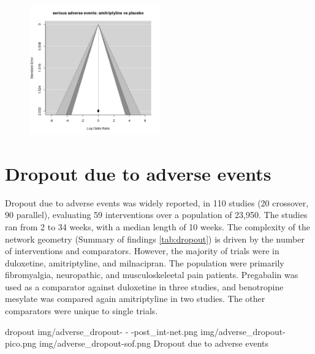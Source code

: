 \documentclass{report}\usepackage[]{graphicx}\usepackage[]{color}
\begin{document}
\begin{figure}
\centering
\includegraphics[width=0.5\textwidth]{
img/serious_adverse-amitriptyline-placebo-funnel.png}
\caption[SAE, amiptriptyline]{}
\label{fig:sae-ami-plac}
\end{figure}


\section{Dropout due to adverse events}

Dropout due to adverse events was widely reported, in 110 studies (20 crossover, 90 parallel), evaluating 59 interventions over a population of 23,950. The studies ran from 2 to 34 weeks, with a median length of 10 weeks. The complexity of the network geometry (Summary of findings \ref{tab:dropout}) is driven by the number of interventions and comparators. However, the majority of trials were in duloxetine, amitriptyline, and milnacipran. The population were primarily fibromyalgia, neuropathic, and musculoskeleetal pain patients. Pregabalin was used as a comparator against duloxetine in three studies, and benotropine mesylate was compared again amitriptyline in two studies. The other comparators were unique to single trials.

\soffignew
{dropout}
{img/adverse_dropout- - -post_int-net.png}
{img/adverse_dropout-pico.png}
{img/adverse_dropout-sof.png}
{Dropout due to adverse events}
\end{document}
